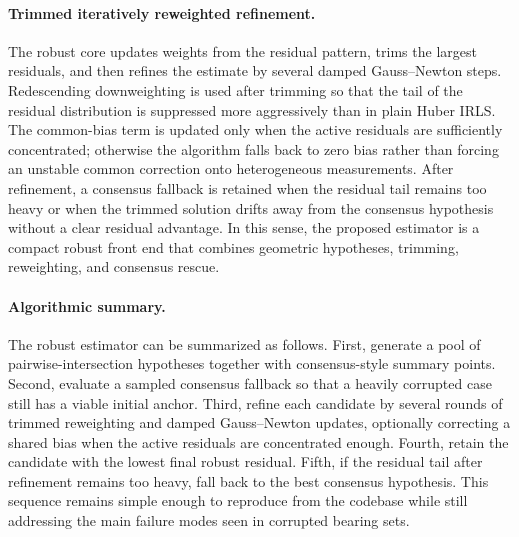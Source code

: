 \documentclass[drones,article,submit,pdftex,moreauthors]{Definitions/mdpi}
\begin{document}
\paragraph{Trimmed iteratively reweighted refinement.}
The robust core updates weights from the residual pattern, trims the largest residuals, and then refines the estimate by several damped Gauss--Newton steps. Redescending downweighting is used after trimming so that the tail of the residual distribution is suppressed more aggressively than in plain Huber IRLS. The common-bias term is updated only when the active residuals are sufficiently concentrated; otherwise the algorithm falls back to zero bias rather than forcing an unstable common correction onto heterogeneous measurements. After refinement, a consensus fallback is retained when the residual tail remains too heavy or when the trimmed solution drifts away from the consensus hypothesis without a clear residual advantage. In this sense, the proposed estimator is a compact robust front end that combines geometric hypotheses, trimming, reweighting, and consensus rescue.

\paragraph{Algorithmic summary.}
The robust estimator can be summarized as follows. First, generate a pool of pairwise-intersection hypotheses together with consensus-style summary points. Second, evaluate a sampled consensus fallback so that a heavily corrupted case still has a viable initial anchor. Third, refine each candidate by several rounds of trimmed reweighting and damped Gauss--Newton updates, optionally correcting a shared bias when the active residuals are concentrated enough. Fourth, retain the candidate with the lowest final robust residual. Fifth, if the residual tail after refinement remains too heavy, fall back to the best consensus hypothesis. This sequence remains simple enough to reproduce from the codebase while still addressing the main failure modes seen in corrupted bearing sets.
\end{document}
